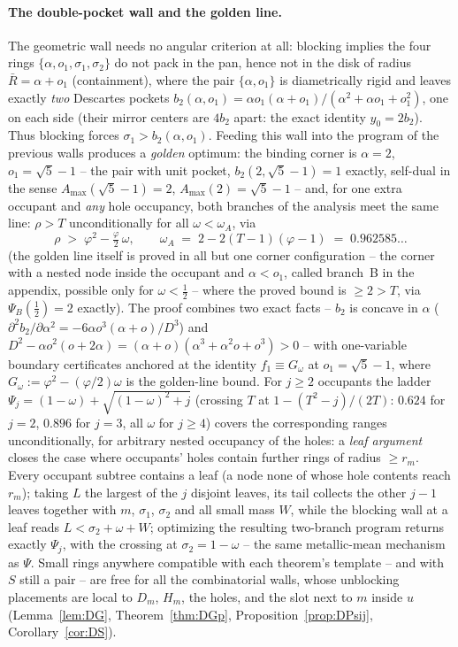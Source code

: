 \documentclass[11pt]{article}
\theoremstyle{definition}
\begin{document}
\paragraph{The double-pocket wall and the golden line.}
The geometric wall needs no angular criterion at all: blocking implies the
four rings $\{\alpha,o_1,\sigma_1,\sigma_2\}$ do not pack in the pan, hence
not in the disk of radius $\bar R=\alpha+o_1$ (containment), where the pair
$\{\alpha,o_1\}$ is diametrically rigid and leaves exactly \emph{two}
Descartes pockets
$b_2(\alpha,o_1)=\alpha o_1(\alpha+o_1)/(\alpha^2+\alpha o_1+o_1^2)$, one on
each side (their mirror centers are $4b_2$ apart: the exact identity
$y_0=2b_2$). Thus blocking forces $\sigma_1>b_2(\alpha,o_1)$. Feeding this
wall into the program of the previous walls produces a \emph{golden} optimum:
the binding corner is $\alpha=2$, $o_1=\sqrt5-1$ -- the pair with unit pocket,
$b_2(2,\sqrt5-1)=1$ exactly, self-dual in the sense
$A_{\max}(\sqrt5-1)=2$, $A_{\max}(2)=\sqrt5-1$ -- and, for one extra occupant
and \emph{any} hole occupancy, both branches of the analysis meet the same
line: $\rho>T$ unconditionally for all $\omega<\omega_A$, via
\[
\rho\;>\;\varphi^2-\tfrac{\varphi}{2}\,\omega,
\qquad
\omega_A\;=\;2-2(T-1)(\varphi-1)\;=\;0.962585\dots
\]
(the golden line itself is proved in all but one corner
configuration -- the corner with a nested node inside the occupant
and $\alpha<o_1$, called branch~B in the appendix, possible
only for $\omega<\tfrac12$ -- where the proved bound is $\ge2>T$, via
$\Psi_B(\tfrac12)=2$ exactly). The proof combines two exact facts -- $b_2$
is concave in $\alpha$
($\partial^2b_2/\partial\alpha^2=-6\alpha o^3(\alpha+o)/D^3$) and
$D^2-\alpha o^2(o+2\alpha)=(\alpha+o)(\alpha^3+\alpha^2o+o^3)>0$ -- with
one-variable boundary certificates anchored at the identity
$f_1\equiv G_\omega$ at $o_1=\sqrt5-1$, where
$G_\omega:=\varphi^2-(\varphi/2)\omega$ is the golden-line bound. For $j\ge2$ occupants the
ladder $\Psi_j=(1-\omega)+\sqrt{(1-\omega)^2+j}$ (crossing $T$ at
$1-(T^2-j)/(2T)$: $0.624$ for $j=2$, $0.896$ for $j=3$, all $\omega$ for
$j\ge4$) covers the corresponding ranges unconditionally, for arbitrary
nested occupancy of the holes: a \emph{leaf argument} closes the case where
occupants' holes contain further rings of radius $\ge r_m$. Every occupant
subtree contains a leaf (a node none of whose hole contents reach $r_m$);
taking $L$ the largest of the $j$ disjoint leaves, its tail collects the
other $j-1$ leaves together with $m$, $\sigma_1$, $\sigma_2$ and all small
mass $W$, while the blocking wall at a leaf reads $L<\sigma_2+\omega+W$;
optimizing the resulting two-branch program returns exactly $\Psi_j$, with
the crossing at $\sigma_2=1-\omega$ -- the same metallic-mean mechanism as
$\Psi$. Small rings anywhere compatible with each theorem's template
-- and with $S$ still a pair -- are free for all the combinatorial walls,
whose unblocking placements are local to $D_m$, $H_m$, the holes, and the
slot next to $m$ inside $u$
(Lemma~\ref{lem:DG}, Theorem~\ref{thm:DGp},
Proposition~\ref{prop:DPsij}, Corollary~\ref{cor:DS}).
\end{document}
